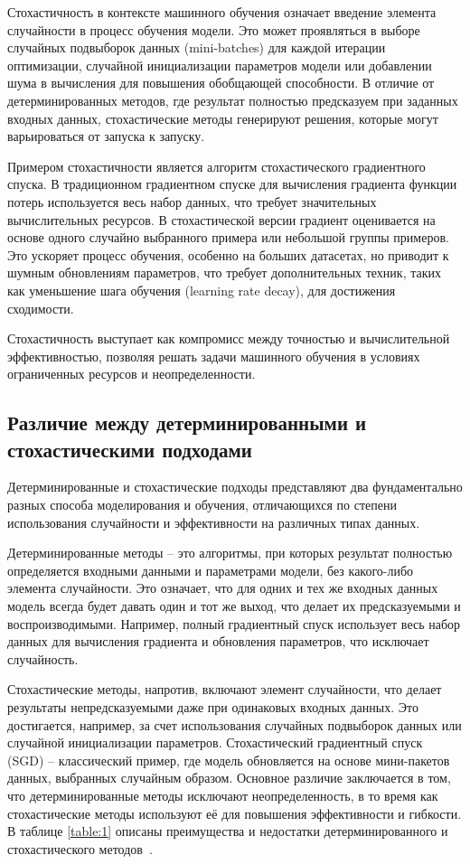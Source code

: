 \documentclass[11pt,a4paper]{article}
\begin{document}
Стохастичность в контексте машинного обучения означает введение элемента случайности в процесс обучения модели. Это может проявляться в выборе случайных подвыборок данных (mini-batches) для каждой итерации оптимизации, случайной инициализации параметров модели или добавлении шума в вычисления для повышения обобщающей способности. В отличие от детерминированных методов, где результат полностью предсказуем при заданных входных данных, стохастические методы генерируют решения, которые могут варьироваться от запуска к запуску.

Примером стохастичности является алгоритм стохастического градиентного спуска. В традиционном градиентном спуске для вычисления градиента функции потерь используется весь набор данных, что требует значительных вычислительных ресурсов. В стохастической версии градиент оценивается на основе одного случайно выбранного примера или небольшой группы примеров. Это ускоряет процесс обучения, особенно на больших датасетах, но приводит к шумным обновлениям параметров, что требует дополнительных техник, таких как уменьшение шага обучения (learning rate decay), для достижения сходимости.

Стохастичность выступает как компромисс между точностью и вычислительной эффективностью, позволяя решать задачи машинного обучения в условиях ограниченных ресурсов и неопределенности.


\subsection{Различие между детерминированными и стохастическими подходами}
Детерминированные и стохастические подходы представляют два фундаментально разных способа моделирования и обучения, отличающихся по степени использования случайности и эффективности на различных типах данных. 

Детерминированные методы -- это алгоритмы, при которых результат полностью определяется входными данными и параметрами модели, без какого-либо элемента случайности. Это означает, что для одних и тех же входных данных модель всегда будет давать один и тот же выход, что делает их предсказуемыми и воспроизводимыми. Например, полный градиентный спуск использует весь набор данных для вычисления градиента и обновления параметров, что исключает случайность.

Стохастические методы, напротив, включают элемент случайности, что делает результаты непредсказуемыми даже при одинаковых входных данных. Это достигается, например, за счет использования случайных подвыборок данных или случайной инициализации параметров. Стохастический градиентный спуск (SGD) -- классический пример, где модель обновляется на основе мини-пакетов данных, выбранных случайным образом. Основное различие заключается в том, что детерминированные методы исключают неопределенность, в то время как стохастические методы используют её для повышения эффективности и гибкости. В таблице \ref{table:1} описаны преимущества и недостатки детерминированного и стохастического методов~\cite{askpython}.
\end{document}
